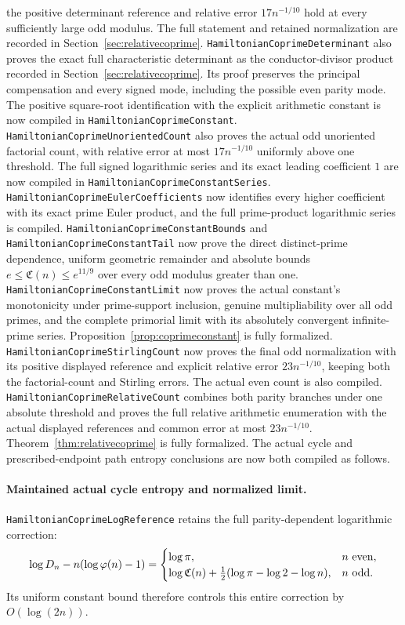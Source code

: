 the positive determinant reference and relative error
\(17n^{-1/10}\) hold at every sufficiently large odd modulus.
The full statement and retained normalization are recorded in
Section~\ref{sec:relativecoprime}.
\texttt{HamiltonianCoprimeDeterminant} also proves the exact
full characteristic determinant as the conductor-divisor product
recorded in Section~\ref{sec:relativecoprime}.
Its proof preserves the principal compensation and every
signed mode, including the possible even parity mode.
The positive square-root identification with the explicit
arithmetic constant is now compiled in
\texttt{HamiltonianCoprimeConstant}.
\texttt{HamiltonianCoprimeUnorientedCount} also proves the
actual odd unoriented factorial count, with relative error
at most \(17n^{-1/10}\) uniformly above one threshold.
The full signed logarithmic series and its exact leading
coefficient \(1\) are now compiled in
\texttt{HamiltonianCoprimeConstantSeries}.
\texttt{HamiltonianCoprimeEulerCoefficients} now identifies
every higher coefficient with its exact prime Euler product,
and the full prime-product logarithmic series is compiled.
\texttt{HamiltonianCoprimeConstantBounds} and
\texttt{HamiltonianCoprimeConstantTail} now prove the direct
distinct-prime dependence, uniform geometric remainder and
absolute bounds \(e\leq\mathfrak C(n)\leq e^{11/9}\) over
every odd modulus greater than one.
\texttt{HamiltonianCoprimeConstantLimit} now proves the actual
constant's monotonicity under prime-support inclusion, genuine
multipliability over all odd primes, and the complete primorial
limit with its absolutely convergent infinite-prime series.
Proposition~\ref{prop:coprimeconstant} is fully formalized.
\texttt{HamiltonianCoprimeStirlingCount} now proves the final
odd normalization with its positive displayed reference and
explicit relative error \(23n^{-1/10}\), keeping both the
factorial-count and Stirling errors.
The actual even count is also compiled.
\texttt{HamiltonianCoprimeRelativeCount} combines both parity
branches under one absolute threshold and proves the full
relative arithmetic enumeration with the actual displayed
references and common error at most \(23n^{-1/10}\).
Theorem~\ref{thm:relativecoprime} is fully formalized.
The actual cycle and prescribed-endpoint path entropy conclusions
are now both compiled as follows.

\paragraph{Maintained actual cycle entropy and normalized limit.}
\texttt{HamiltonianCoprimeLogReference} retains the full
parity-dependent logarithmic correction:
\[
 \log D_n-n(\log\varphi(n)-1)
 =\begin{cases}
 \log\pi,&n\ {\rm even},\\
 \log\mathfrak C(n)+
       \tfrac12(\log\pi-\log2-\log n),&n\ {\rm odd}.
 \end{cases}
\]
Its uniform constant bound therefore controls this entire
correction by \(O(\log(2n))\).

